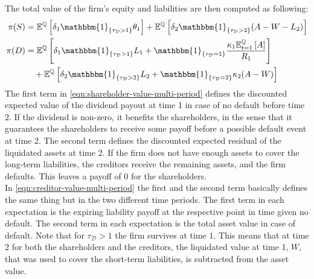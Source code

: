 \documentclass[main.tex]{subfiles}
\begin{document}
        The total value of the firm's equity and liabilities are then computed as following:
        \begin{align}
            \pi(S)&=
            \mathbb{E}^{\rnmeasure}\left[
                \delta_1\mathbbm{1}_{\{\tau_{\mathcal{D}}>1\}} \theta_1\right]
                +
                \mathbb{E}^{\rnmeasure}\left[\delta_{2}\mathbbm{1}_{\{\tau_{\mathcal{D}}>2\}} (A-W-L_{2})
            \right]
            \label{eqn:shareholder-value-multi-period}
            \\
            \nonumber
            \pi(D)&=
            \mathbb{E}^{\rnmeasure}\left[
                \delta_1\mathbbm{1}_{\{\tau_{\mathcal{D}}>1\}} L_1 + \mathbbm{1}_{\{\tau_{\mathcal{D}}=1\}} 
                \frac{
                    \kappa_1 \mathbb{E}_{t=1}^{\rnmeasure}\left[A\right]
                }{
                    R_1
                }
            \right]
            \\
            &\quad+
            \mathbb{E}^{\rnmeasure}\left[
                \delta_{2}\mathbbm{1}_{\{\tau_{\mathcal{D}}>2\}}L_{2}
                +
                \mathbbm{1}_{\{\tau_{\mathcal{D}}=2\}}\kappa_{2}(A-W)
            \right]
            \label{eqn:creditor-value-multi-period}
        \end{align}
        The first term in \cref{eqn:shareholder-value-multi-period} defines the discounted expected value of the dividend payout at time 1 in case of no default before time 2.
        If the dividend is non-zero, it benefits the shareholders,
        in the sense that it guarantees the shareholders to receive some payoff before a possible default event at time 2.
        The second term defines the discounted expected residual of the liquidated assets at time 2.
        If the firm does not have enough assets to cover the long-term liabilities, the creditors receive the remaining assets, and the firm defaults.
        This leaves a payoff of 0 for the shareholders.
        \\
        In \cref{eqn:creditor-value-multi-period} the first and the second term basically defines the same thing but in the two different time periods.
        The first term in each expectation is the expiring liability payoff at the respective point in time given no default.
        The second term in each expectation is the total asset value in case of default.
        Note that for $\tau_{\mathcal{D}}>1$ the firm survives at time 1.
        This means that at time 2 for both the shareholders and the creditors, the liquidated value at time 1, $W$,
        that was used to cover the short-term liabilities, is subtracted from the asset value.
\end{document}
